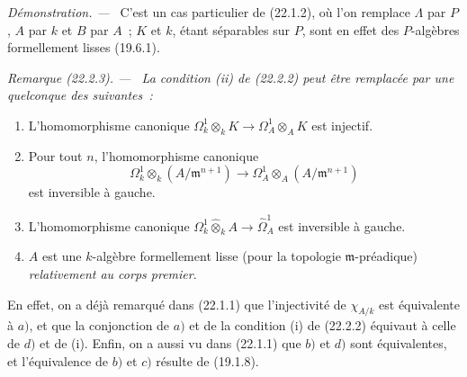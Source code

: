 \documentclass[10pt,oneside]{book}
\makeatletter
\newcommand{\setmanualcurrentlabel}[1]{\def\@currentlabel{#1}}
\newenvironment{remark}[1][]{%
  \setmanualcurrentlabel{#1}\par\medskip\noindent\itshape Remarque (#1). ---\ }{\par}
\newenvironment{proof}{%
  \par\medskip\noindent\textit{Démonstration. ---\ }}{\par}
\makeatother
\begin{document}
\begin{proof}
C'est un cas particulier de (22.1.2), où l'on remplace $\Lambda$ par $P$,
$A$ par $k$ et $B$ par $A$~; $K$ et $k$, étant séparables sur $P$, sont en
effet des $P$-algèbres formellement lisses (19.6.1).
\end{proof}

\begin{remark}[22.2.3]
\label{0.22.2.3-fr}
La condition (ii) de (22.2.2) peut être remplacée par une quelconque des
suivantes~:
\begin{enumerate}
  \item[a)] L'homomorphisme canonique
  $\Omega^1_k\otimes_kK\to\Omega^1_A\otimes_AK$ est injectif.
  \item[b)] Pour tout $n$, l'homomorphisme canonique
  \[
    \Omega^1_k\otimes_k(A/\mathfrak m^{n+1})
    \longrightarrow
    \Omega^1_A\otimes_A(A/\mathfrak m^{n+1})
  \]
  est inversible à gauche.
  \item[c)] L'homomorphisme canonique
  $\Omega^1_k\widehat\otimes_kA\to\widehat\Omega^1_A$ est inversible à
  gauche.
  \item[d)] $A$ est une $k$-algèbre formellement lisse (pour la topologie
  $\mathfrak m$-préadique) \emph{relativement au corps premier}.
\end{enumerate}
En effet, on a déjà remarqué dans (22.1.1) que l'injectivité de $\chi_{A/k}$
est équivalente à $a)$, et que la conjonction de $a)$ et de la condition (i)
de (22.2.2) équivaut à celle de $d)$ et de (i). Enfin, on a aussi vu dans
(22.1.1) que $b)$ et $d)$ sont équivalentes, et l'équivalence de $b)$ et
$c)$ résulte de (19.1.8).
\end{remark}
\end{document}
